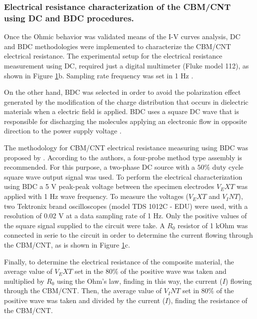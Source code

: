\documentclass[twocolumn]{bmcart}%
\begin{document}
\subsubsection{Electrical resistance characterization of the CBM/CNT using DC and BDC procedures.}\label{DC_BDC}

Once the Ohmic behavior was validated  means of the I-V curves analysis, DC and BDC methodologies were implemented to characterize the  CBM/CNT electrical resistance. The experimental setup for the electrical resistance measurement using DC, required just a digital multimeter (Fluke model 112), as shown in Figure \ref{fig3}b. Sampling rate frequency was set in 1 Hz \cite{Downey2017, Coppola2011, Dong2016}.

On the other hand, BDC was selected in order to avoid the polarization effect generated by the modification of the charge distribution that occurs in dielectric materials when a electric field is applied. BDC uses a square DC wave that is responsible for discharging the molecules applying an electronic flow in opposite direction to the power supply voltage \cite{Downey2017a, BOTTCHER1973}.

The methodology for CBM/CNT electrical resistance measuring  using BDC was proposed by  \citet{Downey2017a}. According to the authors, a four-probe method type assembly is recommended. For this purpose, a two-phase DC source with a $50\%$ duty cycle square wave output signal was used.  To perform the electrical characterization using BDC a 5 V peak-peak voltage between the specimen electrodes $V_EXT$ was applied with 1 Hz wave frequency. To measure the voltages ($V_EXT$ and $V_INT$), two Tektronix brand oscilloscopes (model TDS 1012C - EDU) were used, with a resolution of 0.02 V at a data sampling rate of 1 Hz.  Only the positive values of the square signal supplied to the circuit were take. A $R_0$ resistor of 1 kOhm was connected in serie to the circuit in order to determine the current flowing through the CBM/CNT, as is shown in Figure \ref{fig3}c.

Finally, to determine the electrical resistance of the composite material, the average value of $V_EXT$ set in the $80\%$ of the positive wave was taken and multiplied by $R_0$ using the Ohm's law, finding in this way, the current ($I$) flowing through the CBM/CNT. Then, the average value of $V_INT$ set in $80\%$ of the positive wave was taken and divided by the current ($I$), finding the resistance of the CBM/CNT.

\begin{figure}[h!]
  \caption{
      }
  \label{fig3}
      \end{figure}
\end{document}

